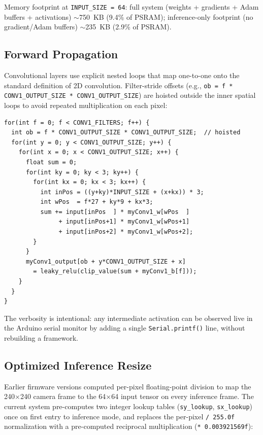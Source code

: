\documentclass[12pt]{article}
\begin{document}
Memory footprint at \texttt{INPUT\_SIZE = 64}: full system (weights + gradients
+ Adam buffers + activations) $\sim$750~KB (9.4\% of PSRAM);
inference-only footprint (no gradient/Adam buffers) $\sim$235~KB (2.9\% of
PSRAM).

\subsection{Forward Propagation}
\label{subsec:forward}

Convolutional layers use explicit nested loops that map one-to-one onto the
standard definition of 2D convolution.
Filter-stride offsets (e.g., \texttt{ob = f * CONV1\_OUTPUT\_SIZE *
CONV1\_OUTPUT\_SIZE}) are hoisted outside the inner spatial loops to avoid
repeated multiplication on each pixel:

\begin{lstlisting}[caption={Conv1 forward pass with pre-computed offsets (Part~2).}]
for(int f = 0; f < CONV1_FILTERS; f++) {
  int ob = f * CONV1_OUTPUT_SIZE * CONV1_OUTPUT_SIZE;  // hoisted
  for(int y = 0; y < CONV1_OUTPUT_SIZE; y++) {
    for(int x = 0; x < CONV1_OUTPUT_SIZE; x++) {
      float sum = 0;
      for(int ky = 0; ky < 3; ky++) {
        for(int kx = 0; kx < 3; kx++) {
          int inPos = ((y+ky)*INPUT_SIZE + (x+kx)) * 3;
          int wPos  = f*27 + ky*9 + kx*3;
          sum += input[inPos  ] * myConv1_w[wPos  ]
               + input[inPos+1] * myConv1_w[wPos+1]
               + input[inPos+2] * myConv1_w[wPos+2];
        }
      }
      myConv1_output[ob + y*CONV1_OUTPUT_SIZE + x]
        = leaky_relu(clip_value(sum + myConv1_b[f]));
    }
  }
}
\end{lstlisting}

The verbosity is intentional: any intermediate activation can be observed live
in the Arduino serial monitor by adding a single \texttt{Serial.printf()} line,
without rebuilding a framework.

\subsection{Optimized Inference Resize}
\label{subsec:infresize}

Earlier firmware versions computed per-pixel floating-point division to map the
240$\times$240 camera frame to the 64$\times$64 input tensor on every inference
frame.
The current system pre-computes two integer lookup tables
(\texttt{sy\_lookup}, \texttt{sx\_lookup}) once on first entry to inference
mode, and replaces the per-pixel \texttt{/ 255.0f} normalization with a
pre-computed reciprocal multiplication (\texttt{* 0.003921569f}):
\end{document}

